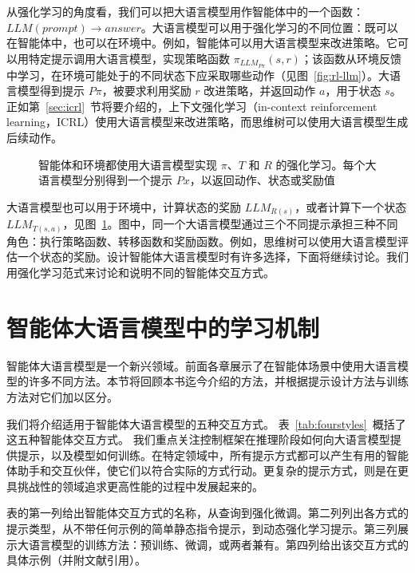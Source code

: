 从强化学习的角度看，我们可以把大语言模型用作智能体中的一个函数：$LLM(prompt) \rightarrow answer$。大语言模型可以用于强化学习的不同位置：既可以在智能体中，也可以在环境中。例如，智能体可以用大语言模型来改进策略。它可以用特定提示调用大语言模型，实现策略函数 $\pi_{LLM_{P\pi}}(s,r)$；该函数从环境反馈中学习，在环境可能处于的不同状态下应采取哪些动作（见图~\ref{fig:rl-llm}）。大语言模型得到提示 $P\pi$，被要求利用奖励 $r$ 改进策略，并返回动作 $a$，用于状态 $s$。正如第~\ref{sec:icrl}~节将要介绍的，上下文强化学习（in-context reinforcement learning，ICRL）使用大语言模型来改进策略，而思维树可以使用大语言模型生成后续动作。

\begin{figure}
  \begin{center}
    
    \caption{智能体和环境都使用大语言模型实现 $\pi$、$T$ 和 $R$ 的强化学习。每个大语言模型分别得到一个提示 $Px$，以返回动作、状态或奖励值}\label{fig:rl-llm2}
  \end{center}
\end{figure}

大语言模型也可以用于环境中，计算状态的奖励 $LLM_{R(s)}$，或者计算下一个状态 $LLM_{T(s,a)}$，见图~\ref{fig:rl-llm2}。图中，同一个大语言模型通过三个不同提示承担三种不同角色：执行策略函数、转移函数和奖励函数。例如，思维树可以使用大语言模型评估一个状态的奖励。设计智能体大语言模型时有许多选择，下面将继续讨论。我们用强化学习范式来讨论和说明不同的智能体交互方式。


\section{智能体大语言模型中的学习机制}\label{sec:styles}
智能体大语言模型是一个新兴领域。前面各章展示了在智能体场景中使用大语言模型的许多不同方法。本节将回顾本书迄今介绍的方法，并根据提示设计方法与训练方法对它们加以区分。


我们将介绍适用于智能体大语言模型的五种交互方式。
表~\ref{tab:fourstyles}~概括了这五种智能体交互方式。
我们重点关注控制框架在推理阶段如何向大语言模型提供提示，以及模型如何训练。在特定领域中，所有提示方式都可以产生有用的智能体助手和交互伙伴，使它们以符合实际的方式行动。更复杂的提示方式，则是在更具挑战性的领域追求更高性能的过程中发展起来的。

表的第一列给出智能体交互方式的名称，从查询到强化微调。第二列列出各方式的提示类型，从不带任何示例的简单静态指令提示，到动态强化学习提示。第三列展示大语言模型的训练方法：预训练、微调，或两者兼有。第四列给出该交互方式的具体示例（并附文献引用）。


